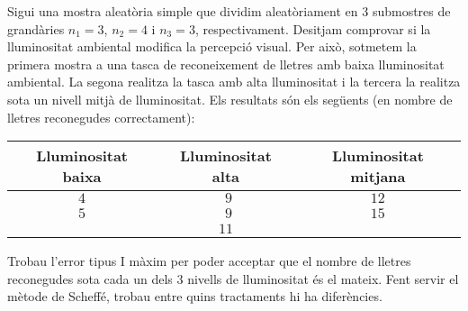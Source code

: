 \begin{probres}
{Sigui una mostra aleat\`oria simple que
dividim aleat\`oriament en 3 submostres de grand\`aries $n_1=3$,
$n_2=4$ i $n_3=3$, respectivament. Desitjam comprovar si
la lluminositat ambiental modifica la percepci\'o visual.
Per aix\`o, sotmetem la primera mostra a una tasca de
reconeixement de lletres amb baixa lluminositat
ambiental. La segona realitza la tasca amb alta
lluminositat i la tercera la realitza sota un nivell
mitj\`a de lluminositat. Els resultats s\'on els
seg\"uents (en nombre de lletres reconegudes
correctament):
\begin{center}
\begin{tabular}{|c|c|c|}
\hline
Lluminositat
baixa&Lluminositat alta&Lluminositat
mitjana\\\hline\hline
$4$&$\ \,9$&$12$\\\hline
$5$&$\ \,9$&$15$\\\hline
 &$11$& \\\hline
\end{tabular}
\end{center}
Trobau l'error tipus I m\`axim per poder acceptar que el nombre de lletres
reconegudes sota cada un dels $3$ nivells de lluminositat \'es el mateix. 
Fent servir el m\`etode de Scheff\'e, trobau entre quins
tractaments hi ha difer\`encies.}
\end{probres}

